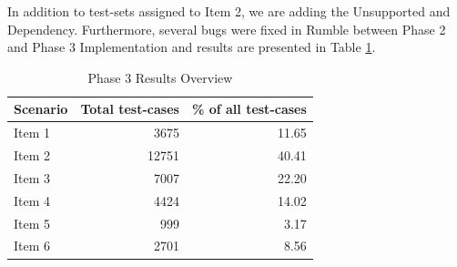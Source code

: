In addition to test-sets assigned to Item 2, we are adding the Unsupported and Dependency. Furthermore, several bugs were fixed in Rumble between Phase 2 and Phase 3 Implementation and results are presented in Table \ref{tab:Phase3_ResultTable}.
\begin{table}[h!]
	\centering
	\begin{tabular}{|l|r|r|}
		\hline
		\multicolumn{1}{|c|}{Scenario} & \multicolumn{1}{c|}{Total test-cases} & \multicolumn{1}{c|}{\% of all test-cases} \\ \hline
		Item 1                         & 3675                                  & 11.65                                     \\ \hline
		Item 2                         & 12751                                 & 40.41                                     \\ \hline
		Item 3                         & 7007                                  & 22.20                                     \\ \hline
		Item 4                         & 4424                                  & 14.02                                     \\ \hline
		Item 5                         & 999                                   & 3.17                                      \\ \hline
		Item 6                         & 2701                                  & 8.56                                      \\ \hline
	\end{tabular}
	\caption{Phase 3 Results Overview}
	\label{tab:Phase3_ResultTable}
\end{table}

